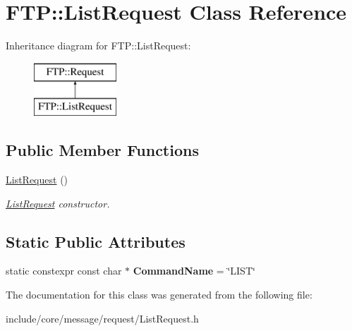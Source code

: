 \hypertarget{class_f_t_p_1_1_list_request}{\section{F\-T\-P\-:\-:List\-Request Class Reference}
\label{class_f_t_p_1_1_list_request}
}
Inheritance diagram for F\-T\-P\-:\-:List\-Request\-:\begin{figure}[H]
\begin{center}
\leavevmode
\includegraphics[height=2.000000cm]{class_f_t_p_1_1_list_request}
\end{center}
\end{figure}
\subsection*{Public Member Functions}
\begin{DoxyCompactItemize}
\item 
\hypertarget{class_f_t_p_1_1_list_request_aa6b1eb7e03533491a28bf8ba800e1989}{\hyperlink{class_f_t_p_1_1_list_request_aa6b1eb7e03533491a28bf8ba800e1989}{List\-Request} ()}\label{class_f_t_p_1_1_list_request_aa6b1eb7e03533491a28bf8ba800e1989}

\begin{DoxyCompactList}\small\item\em \hyperlink{class_f_t_p_1_1_list_request}{List\-Request} constructor. \end{DoxyCompactList}\end{DoxyCompactItemize}
\subsection*{Static Public Attributes}
\begin{DoxyCompactItemize}
\item 
\hypertarget{class_f_t_p_1_1_list_request_ac8ac654082b68fbb98934517c0387f67}{static constexpr const char $\ast$ {\bfseries Command\-Name} = \char`\"{}L\-I\-S\-T\char`\"{}}\label{class_f_t_p_1_1_list_request_ac8ac654082b68fbb98934517c0387f67}

\end{DoxyCompactItemize}


The documentation for this class was generated from the following file\-:\begin{DoxyCompactItemize}
\item 
include/core/message/request/List\-Request.\-h\end{DoxyCompactItemize}

